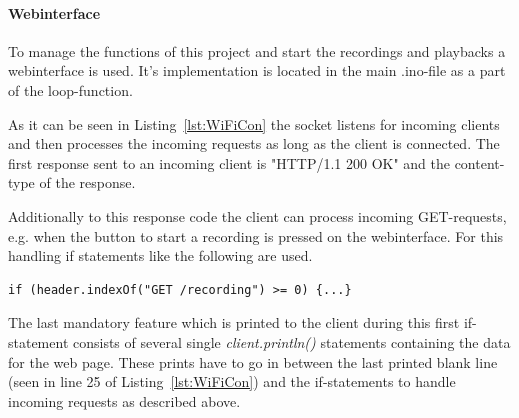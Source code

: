 \paragraph{Webinterface}
To manage the functions of this project and start the recordings and playbacks a webinterface is used.
It's implementation is located in the main .ino-file as a part of the loop-function.

As it can be seen in Listing~\ref{lst:WiFiCon} the socket listens for incoming clients and then processes the incoming requests as long as the client is connected.
The first response sent to an incoming client is "HTTP/1.1 200 OK" and the content-type of the response.

Additionally to this response code the client can process incoming GET-requests, e.g. when the button to start a recording is pressed on the webinterface.
For this handling if statements like the following are used.
\begin{lstlisting}[style=inText] 
	if (header.indexOf("GET /recording") >= 0) {...}  
\end{lstlisting}
The last mandatory feature which is printed to the client during this first if-statement consists of several single \textit{client.println()} statements containing the data for the web page.
These prints have to go in between the last printed blank line (seen in line 25 of Listing~\ref{lst:WiFiCon}) and the if-statements to handle incoming requests as described above.

